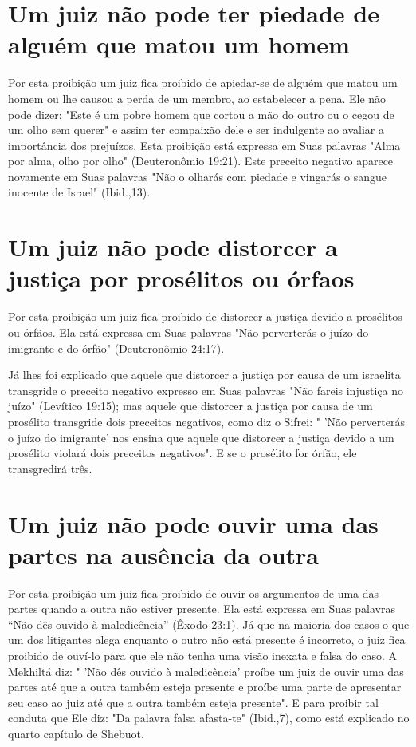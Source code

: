 \section{Um juiz não pode ter piedade de alguém que matou um homem}

Por esta proibição um juiz fica proibido de apiedar-se de alguém que
matou um homem ou lhe causou a perda de um membro, ao estabelecer a
pe­na. Ele não pode dizer: "Este é um pobre homem que cortou a mão do
outro ou o cegou de um olho sem querer" e assim ter compaixão dele e ser
indulgen­te ao avaliar a importância dos prejuízos. Esta proibição está
expressa em Suas palavras "Alma por alma, olho por olho" (Deuteronômio
19:21). Este preceito negativo aparece novamente em Suas palavras "Não o
olharás com piedade e vingarás o sangue inocente de Israel" (Ibid.,13).

\section{Um juiz não pode distorcer a justiça por prosélitos ou órfaos}

Por esta proibição um juiz fica proibido de distorcer a justiça devi­do
a prosélitos ou órfãos. Ela está expressa em Suas palavras "Não
perverterás o juízo do imigrante e do órfão" (Deuteronômio 24:17).

Já lhes foi explicado que aquele que distorcer a justiça por causa de um
israelita transgride o preceito negativo expresso em Suas palavras "Não
fa­reis injustiça no juízo" (Levítico 19:15); mas aquele que distorcer a
justiça por causa de um prosélito transgride dois preceitos negativos,
como diz o Sifrei: " 'Não perverterás o juízo do imigrante' nos ensina
que aquele que distorcer a justiça devido a um prosélito violará dois
preceitos negativos". E se o proséli­to for órfão, ele transgredirá
três.

\section{Um juiz não pode ouvir uma das partes na ausência da outra}

Por esta proibição um juiz fica proibido de ouvir os argumentos de uma
das partes quando a outra não estiver presente. Ela está expressa em
Suas palavras ``Não dês ouvido à maledicência'' (Êxodo 23:1). Já que na
maioria dos casos o que um dos litigantes alega enquanto o outro não
está presente é incor­reto, o juiz fica proibido de ouví-lo para que ele
não tenha uma visão inexata e falsa do caso. A Mekhiltá diz: " 'Não dês
ouvido à maledicência' proíbe um juiz de ouvir uma das partes até que a
outra também esteja presente e proíbe uma parte de apresentar seu caso
ao juiz até que a outra também esteja presen­te". E para proibir tal
conduta que Ele diz: "Da palavra falsa afasta-te" (Ibid.,7), como está
explicado no quarto capítulo de Shebuot.

